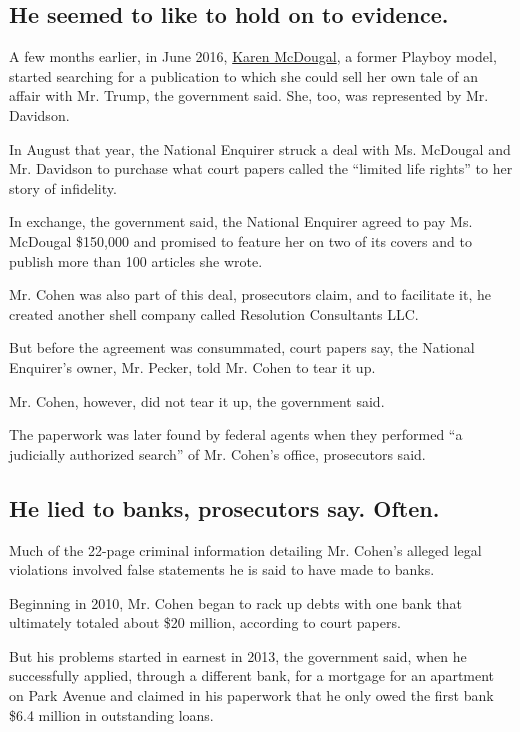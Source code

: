 \hypertarget{he-seemed-to-like-to-hold-on-to-evidence}{%
\subsection{He seemed to like to hold on to
evidence.}\label{he-seemed-to-like-to-hold-on-to-evidence}}

A few months earlier, in June 2016,
\href{https://www.nytimes3xbfgragh.onion/2018/03/22/us/politics/karen-mcdougal-interview.html}{Karen
McDougal}, a former Playboy model, started searching for a publication
to which she could sell her own tale of an affair with Mr. Trump, the
government said. She, too, was represented by Mr. Davidson.

In August that year, the National Enquirer struck a deal with Ms.
McDougal and Mr. Davidson to purchase what court papers called the
``limited life rights'' to her story of infidelity.

In exchange, the government said, the National Enquirer agreed to pay
Ms. McDougal \$150,000 and promised to feature her on two of its covers
and to publish more than 100 articles she wrote.

Mr. Cohen was also part of this deal, prosecutors claim, and to
facilitate it, he created another shell company called Resolution
Consultants LLC.

But before the agreement was consummated, court papers say, the National
Enquirer's owner, Mr. Pecker, told Mr. Cohen to tear it up.

Mr. Cohen, however, did not tear it up, the government said.

The paperwork was later found by federal agents when they performed ``a
judicially authorized search'' of Mr. Cohen's office, prosecutors said.

\hypertarget{he-lied-to-banks-prosecutors-say-often}{%
\subsection{He lied to banks, prosecutors say.
Often.}\label{he-lied-to-banks-prosecutors-say-often}}

Much of the 22-page criminal information detailing Mr. Cohen's alleged
legal violations involved false statements he is said to have made to
banks.

Beginning in 2010, Mr. Cohen began to rack up debts with one bank that
ultimately totaled about \$20 million, according to court papers.

But his problems started in earnest in 2013, the government said, when
he successfully applied, through a different bank, for a mortgage for an
apartment on Park Avenue and claimed in his paperwork that he only owed
the first bank \$6.4 million in outstanding loans.

